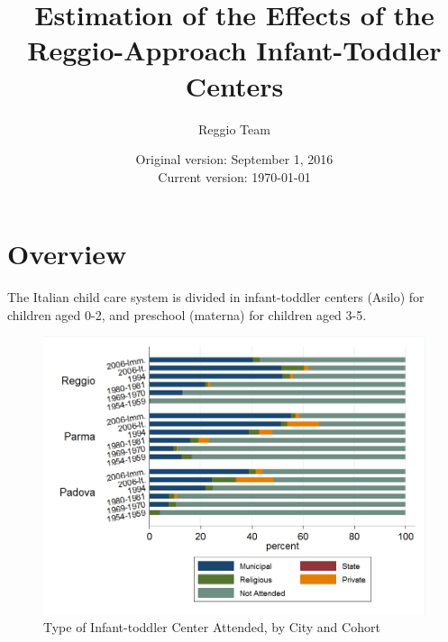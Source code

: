 



\title{Estimation of the Effects of the Reggio-Approach Infant-Toddler Centers}
\author{Reggio Team}
\date{Original version: September 1, 2016 \\ Current version: \today}
\maketitle

\doublespacing

\section{Overview}

The Italian child care system is divided in infant-toddler centers (Asilo) for children aged 0-2, and preschool (materna) for children aged 3-5. 

\begin{landscape}

\begin{figure}
\caption{Type of Infant-toddler Center Attended, by City and Cohort}
\includegraphics[scale=0.7]{../../../../output/image/asiloType-Attend.png} 
\end{figure}

\end{landscape}


